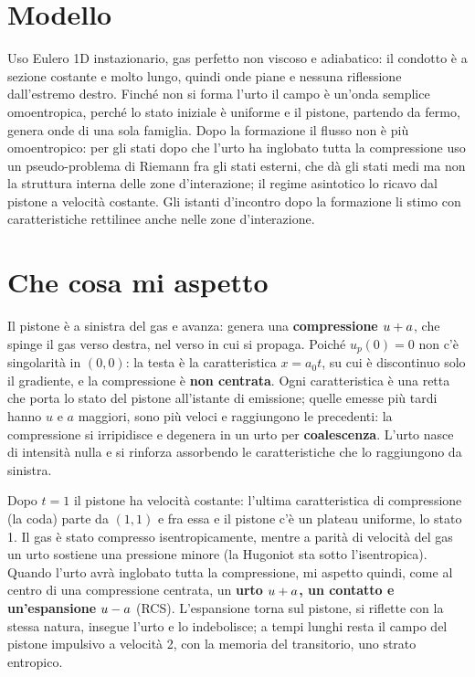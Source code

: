 \section*{Modello}
Uso Eulero 1D instazionario, gas perfetto non viscoso e adiabatico: il condotto è a sezione costante e molto lungo,
quindi onde piane e nessuna riflessione dall'estremo destro. Finché non si forma l'urto il campo è un'onda semplice
omoentropica, perché lo stato iniziale è uniforme e il pistone, partendo da fermo, genera onde di una sola famiglia.
Dopo la formazione il flusso non è più omoentropico: per gli stati dopo che l'urto ha inglobato tutta la
compressione uso un pseudo-problema di Riemann fra gli stati esterni, che dà gli stati medi ma non la struttura
interna delle zone d'interazione; il regime asintotico lo ricavo dal pistone a velocità costante. Gli istanti
d'incontro dopo la formazione li stimo con caratteristiche rettilinee anche nelle zone d'interazione.

\section*{Che cosa mi aspetto}
Il pistone è a sinistra del gas e avanza: genera una \textbf{compressione $u+a$}, che spinge il gas verso destra,
nel verso in cui si propaga. Poiché $u_p(0)=0$ non c'è singolarità in $(0,0)$: la testa è la caratteristica $x=a_0t$,
su cui è discontinuo solo il gradiente, e la compressione è \textbf{non centrata}. Ogni caratteristica è una retta che
porta lo stato del pistone all'istante di emissione; quelle emesse più tardi hanno $u$ e $a$ maggiori, sono più
veloci e raggiungono le precedenti: la compressione si irripidisce e degenera in un urto per \textbf{coalescenza}.
L'urto nasce di intensità nulla e si rinforza assorbendo le caratteristiche che lo raggiungono da sinistra.

Dopo $t=1$ il pistone ha velocità costante: l'ultima caratteristica di compressione (la coda) parte da $(1,1)$ e fra
essa e il pistone c'è un plateau uniforme, lo stato 1. Il gas è stato compresso isentropicamente, mentre a parità di
velocità del gas un urto sostiene una pressione minore (la Hugoniot sta sotto l'isentropica). Quando l'urto avrà
inglobato tutta la compressione, mi aspetto quindi, come al centro di una compressione centrata, un \textbf{urto
$u+a$, un contatto e un'espansione $u-a$} (RCS). L'espansione torna sul pistone, si riflette con la stessa natura,
insegue l'urto e lo indebolisce; a tempi lunghi resta il campo del pistone impulsivo a velocità 2, con la memoria del
transitorio, uno strato entropico.

